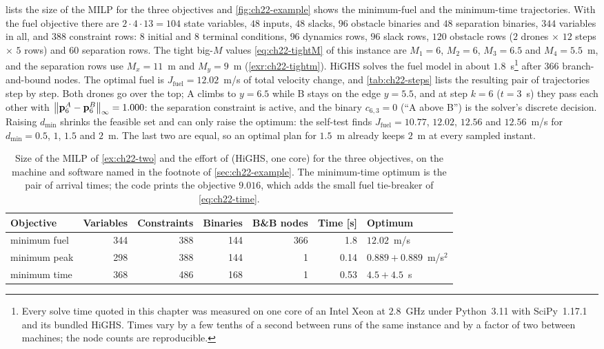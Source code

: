  lists the size of the MILP for the three objectives
and \cref{fig:ch22-example} shows the minimum-fuel and the minimum-time
trajectories. With the fuel objective there are $2 \cdot 4 \cdot 13 = 104$
state variables, $48$ inputs, $48$ slacks, $96$ obstacle binaries and $48$
separation binaries, $344$ variables in all, and $388$ constraint rows:
$8$ initial and $8$ terminal conditions, $96$ dynamics rows, $96$ slack rows,
$120$ obstacle rows ($2$ drones $\times$ $12$ steps $\times$ $5$ rows) and
$60$ separation rows. The tight big-$M$ values \cref{eq:ch22-tightM} of this instance are
$M_1 = 6$, $M_2 = 6$, $M_3 = 6.5$ and $M_4 = 5.5$~m, and the separation rows
use $M_x = 11$~m and $M_y = 9$~m (\cref{exr:ch22-tightm}). HiGHS solves the
fuel model in about $1.8$~s\footnote{Every solve time quoted in this chapter
was measured on one core of an Intel Xeon at $2.8$~GHz under Python~3.11
with SciPy~1.17.1 and its bundled HiGHS. Times vary by a few tenths of a
second between runs of the same instance and by a factor of two between
machines; the node counts are reproducible.} after $366$
branch-and-bound nodes. The optimal fuel is $J_{\mathrm{fuel}} = 12.02$~m/s
of total velocity change, and \cref{tab:ch22-steps} lists the resulting pair of
trajectories step by step. Both drones go over the top; A climbs to $y =
6.5$ while B stays on the edge $y = 5.5$, and at step $k = 6$ ($t = 3$~s)
they pass each other with $\left\lVert \mathbf{p}^A_6 - \mathbf{p}^B_6 \right\rVert_\infty = 1.000$: the
separation constraint is active, and the binary $c_{6,3} = 0$ (``A above B'')
is the solver's discrete decision. Raising $d_{\min}$ shrinks the feasible
set and can only raise the optimum: the self-test finds $J_{\mathrm{fuel}} =
10.77$, $12.02$, $12.56$ and $12.56$~m/s for $d_{\min} = 0.5$, $1$, $1.5$ and
$2$~m. The last two are equal, so an optimal plan for $1.5$~m already keeps
$2$~m at every sampled instant.

\begin{table}[tb]
  \centering\small
  \caption{Size of the MILP of \cref{ex:ch22-two} and the effort of
   (HiGHS, one core) for the three objectives, on
  the machine and software named in the footnote of \cref{sec:ch22-example}. The minimum-time optimum is the
  pair of arrival times; the code prints the objective $9.016$, which adds
  the small fuel tie-breaker of \cref{eq:ch22-time}.}
  \label{tab:ch22-sizes}
  \begin{tabular}{@{}lrrrrrl@{}}
  \toprule
  Objective & Variables & Constraints & Binaries & B\&B nodes & Time [s] & Optimum\\
  \midrule
  minimum fuel & 344 & 388 & 144 & 366 & 1.8 & $12.02$~m/s\\
  minimum peak & 298 & 388 & 144 & 1 & 0.14 & $0.889 + 0.889$~m/s$^2$\\
  minimum time & 368 & 486 & 168 & 1 & 0.53 & $4.5 + 4.5$~s\\
  \bottomrule
  \end{tabular}
\end{table}


